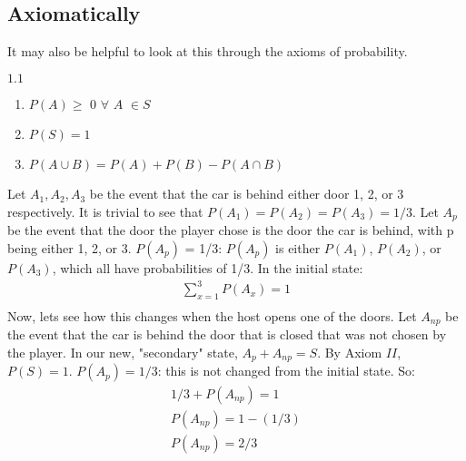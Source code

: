\documentclass{article}
\begin{document}
\subsection{Axiomatically}
It may also be helpful to look at this through the axioms of probability. 
\break\break
\begin{Large}
\textsection $1.1$
\end{Large}
\begin{enumerate}[I]
	\item $P(A) \geq$ 0 $\forall$  $A$ $\in S$
	\item $P(S) = 1$
	\item $P(A \cup B) = P(A) + P(B) - P(A \cap B)$
\end{enumerate}
Let $A_{1}, A_{2}, A_{3}$ be the event that the car is behind either door 1, 2, or 3 respectively. It is trivial to see that $P(A_{1}) = P(A_{2}) = P(A_{3}) = 1/3$. Let $A_{p}$ be the event that the door the player chose is the door the car is behind, with p being either 1, 2, or 3. $P(A_{p})$ = 1/3: $P(A_{p})$ is either $P(A_{1})$, $P(A_{2})$, or $P(A_{3})$, which all have probabilities of 1/3. In the initial state:
\begin{align*}
	\sum_{x=1}^{3} P(A_{x}) = 1 \\
\end{align*} 
Now, lets see how this changes when the host opens one of the doors. 
\break \break
Let $A_{np}$ be the event that the car is behind the door that is closed that was not chosen by the player. In our new, "secondary" state, $A_{p} + A_{np} = S$. By Axiom $II$, $P(S) = 1$. $P(A_{p}) = 1/3$: this is not changed from the initial state. So:
\begin{align*}
1/3 + P(A_{np}) = 1 \\
P(A_{np}) = 1-(1/3) \\
P(A_{np}) = 2/3 \\
\end{align*}
\end{document}
